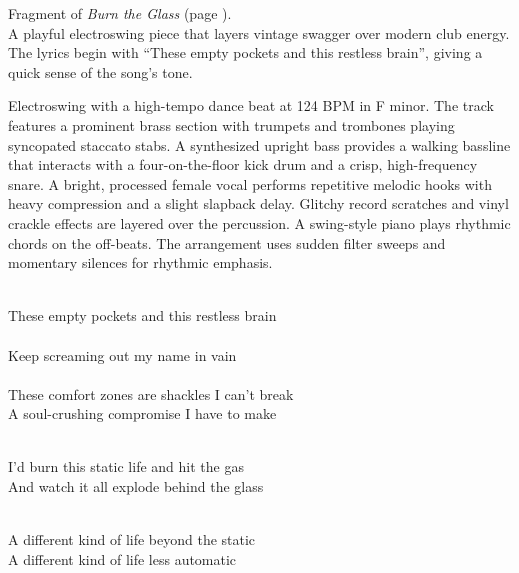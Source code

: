 

\begin{notes}
Fragment of \emph{Burn the Glass} (page \pageref{sec:burn-the-glass}).\\
A playful electroswing piece that layers vintage swagger over modern club energy. %
The lyrics begin with “These empty pockets and this restless brain”, giving a quick sense of the song’s tone.
\end{notes}

\begin{style}
Electroswing with a high-tempo dance beat at 124 BPM in F minor. %
The track features a prominent brass section with trumpets and trombones playing syncopated staccato stabs. %
A synthesized upright bass provides a walking bassline that interacts with a four-on-the-floor kick drum and a crisp, high-frequency snare. %
A bright, processed female vocal performs repetitive melodic hooks with heavy compression and a slight slapback delay. %
Glitchy record scratches and vinyl crackle effects are layered over the percussion. %
A swing-style piano plays rhythmic chords on the off-beats. %
The arrangement uses sudden filter sweeps and momentary silences for rhythmic emphasis.
\end{style}

\begin{lyrics}

\\
These empty pockets and this restless brain\\
\\
Keep screaming out my name in vain\\
\\
These comfort zones are shackles I can't break\\
A soul-crushing compromise I have to make

\\
I'd burn this static life and hit the gas\\
And watch it all explode behind the glass

\\
A different kind of life beyond the static\\
A different kind of life less automatic

\end{lyrics}

